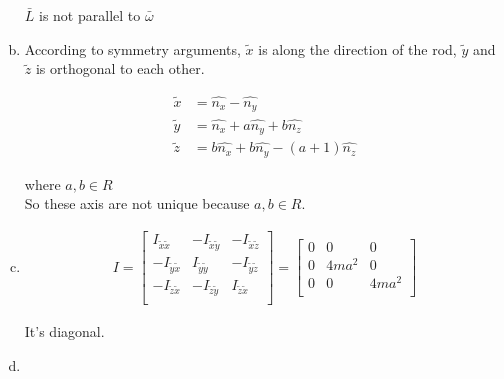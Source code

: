\documentclass{article}
\begin{document}
\begin{enumerate}[(a)]
\begin{center}
$\bar{L}$ is not parallel to $\bar{\omega}$
\end{center}

\item
According to symmetry arguments, $\tilde{x}$ is along the direction of the rod, $\tilde{y}$ and $\tilde{z}$ is orthogonal to each other.

\begin{align*}
\tilde{x}&=\hat{n_x}-\hat{n_y}\\
\tilde{y}&=\hat{n_x}+a\hat{n_y}+b\hat{n_z}\\
\tilde{z}&=b\hat{n_x}+b\hat{n_y}-(a+1)\hat{n_z}
\end{align*}

where $a,b\in R$\\
So these axis are not unique because $a,b\in R$.

\item
\begin{gather*}
I=
\begin{bmatrix}
	 I_{\tilde{x}\tilde{x}} & -I_{\tilde{x}\tilde{y}} & -I_{\tilde{x}\tilde{z}}\\
	-I_{\tilde{y}\tilde{x}} &  I_{\tilde{y}\tilde{y}} & -I_{\tilde{y}\tilde{z}}\\
	-I_{\tilde{z}\tilde{x}} & -I_{\tilde{z}\tilde{y}} &  I_{\tilde{z}\tilde{x}}\\
\end{bmatrix}
=
\begin{bmatrix}
	    0   & 	  0	  &     0	\\
		0	&  4ma^2  &     0   \\
	    0   & 	  0	  &  4ma^2	\\
\end{bmatrix}
\end{gather*}

It's diagonal.

\item


\end{enumerate}
\end{document}
